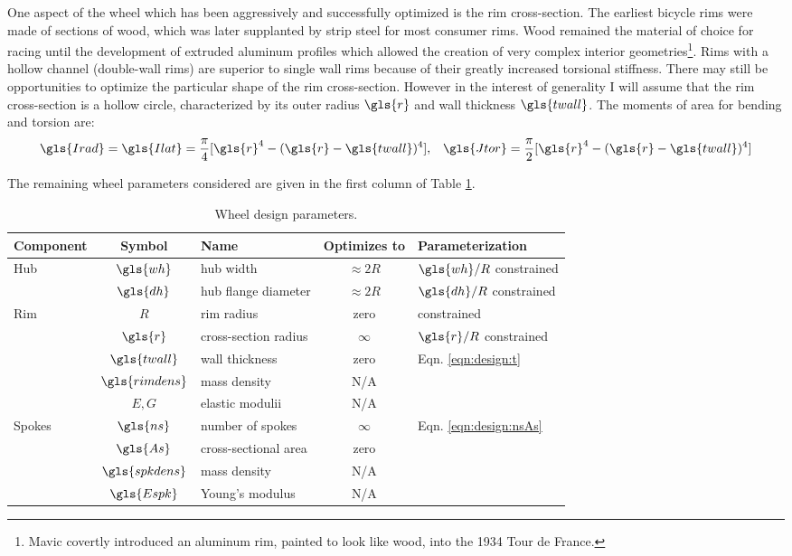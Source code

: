 \documentclass[\rootdir/thesis.tex]{subfiles}
\begin{document}
One aspect of the wheel which has been aggressively and successfully optimized is the rim cross-section. The earliest bicycle rims were made of sections of wood, which was later supplanted by strip steel for most consumer rims. Wood remained the material of choice for racing until the development of extruded aluminum profiles which allowed the creation of very complex interior geometries\footnote{Mavic covertly introduced an aluminum rim, painted to look like wood, into the 1934 Tour de France.}. Rims with a hollow channel (double-wall rims) are superior to single wall rims because of their greatly increased torsional stiffness. There may still be opportunities to optimize the particular shape of the rim cross-section. However in the interest of generality I will assume that the rim cross-section is a hollow circle, characterized by its outer radius $\gls{r}$ and wall thickness $\gls{twall}$. The moments of area for bending and torsion are:
\begin{equation}
\gls{Irad} = \gls{Ilat} = \frac{\pi}{4} [\gls{r}^4 - (\gls{r}-\gls{twall})^4], \,\,\,\,\,
\gls{Jtor} = \frac{\pi}{2} [\gls{r}^4 - (\gls{r}-\gls{twall})^4]
\end{equation}

The remaining wheel parameters considered are given in the first column of Table \ref{tab:design_space}.

\begin{table}
\caption{Wheel design parameters.}
\label{tab:design_space}
\begin{tabular}{lclcl}
\hline
\bf Component & \bf Symbol & \bf Name & \bf Optimizes to & \bf Parameterization\\
\hline
\multirow{2}{*}{Hub} & $\gls{wh}$ & hub width            & $\approx 2R$ & $\gls{wh}/R$ constrained\\
                     & $\gls{dh}$ & hub flange diameter  & $\approx 2R$ & $\gls{dh}/R$ constrained\\
\hline
\multirow{5}{*}{Rim} & $R$             & rim radius           & zero     & constrained\\
                     & $\gls{r}$       & cross-section radius & $\infty$ & $\gls{r}/R$ constrained\\
                     & $\gls{twall}$   & wall thickness       & zero     & Eqn. \eqref{eqn:design:t}\\
                     & $\gls{rimdens}$ & mass density         & N/A\\
                     & $E,G$           & elastic modulii      & N/A\\
\hline
\multirow{4}{*}{Spokes} & $\gls{ns}$      & number of spokes  & $\infty$ & \multirow{2}{*}{Eqn. \eqref{eqn:design:nsAs}}\\
                        & $\gls{As}$      & cross-sectional area & zero\\
                        & $\gls{spkdens}$ & mass density   & N/A\\
                        & $\gls{Espk}$    & Young's modulus & N/A\\
\hline
\end{tabular}
\end{table}
\end{document}
